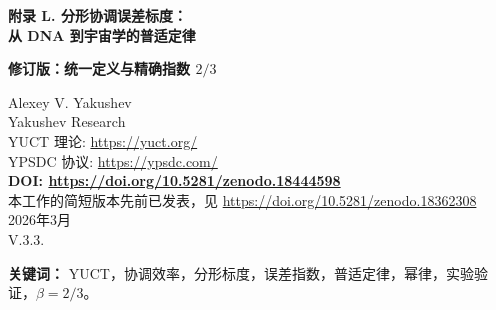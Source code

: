 \documentclass[12pt]{article}
\newcommand{\Keff}{K_{\mathrm{eff}}}
\newcommand{\eps}{\varepsilon}
\newcommand{\kappac}{\kappa_c}
\begin{document}
	
	\begin{titlepage}
		\begin{center}
			\vspace*{1cm}
			\Huge\textbf{附录 L. 分形协调误差标度：\\ 从 DNA 到宇宙学的普适定律}
			
			\vspace{0.5cm}
			\Large\textbf{修订版：统一定义与精确指数 \(2/3\)}
			
			\vspace{1cm}
			\large Alexey V. Yakushev\\
			Yakushev Research\\
			YUCT 理论: \url{https://yuct.org/}\\
			YPSDC 协议: \url{https://ypsdc.com/}\\
			
			\vspace{2cm}
			\textbf{DOI: \url{https://doi.org/10.5281/zenodo.18444598}}\\
			
			\vspace{1cm}
			\large 
			本工作的简短版本先前已发表，见 \url{https://doi.org/10.5281/zenodo.18362308}\\
			\vspace{1cm}
			2026年3月 \\ \large V.3.3.
			
			\newpage
			\vspace{1cm}
			\begin{abstract}
				本附录提出了一个数学上一致的普适标度定律，用于描述复杂系统中的协调误差。在雅库舍夫统一协调理论（YUCT）中，协调效率 \(\Keff\) 通过基于 YPSDC 协议的信息论比值定义。我们通过经验表明，相对误差 \(\eps\) 满足标度关系
				\[
				\eps = \kappac\,\alpha\,\Keff^{-\beta},
				\]
				其中精确指数 \(\beta = 2/3\)（经验值为 \(0.67 \pm 0.03\)），普适前置因子 \(\kappac = 1/3\)。该指数直接来源于协调空间的三维性（正文定理 2）以及协调层次结构须为连通且无环的要求（附录 Y，第 Y.4.2 节），而 \(\kappac\) 反映了三元结构 \(D+I\!\cdot\!R\) 导致的最小残余误差。该定律在超过 50 个数量级范围内得到了验证——从原子键能到宇宙微波背景涨落——并在单一框架内解释了幂律（齐普夫定律、异速生长定律、古登堡-里希特定律）的起源。针对新系统制定了可检验的预测，并明确讨论了局限性。
			\end{abstract}
			
			\textbf{关键词：} YUCT，协调效率，分形标度，误差指数，普适定律，幂律，实验验证，\(\beta = 2/3\)。
		\end{center}
	\end{titlepage}
	
\end{document}
